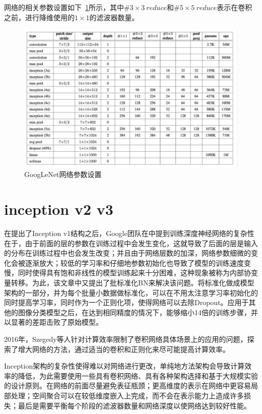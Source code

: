 网络的相关参数设置如下~\ref{fig:GoogLeNet_params}所示，其中$\#3\times3\ reduce$和$\#5\times5\ reduce$表示在卷积之前，进行降维使用的$1\times1$的滤波器数量。

\begin{figure}[htbp]
	\centering
	\includegraphics[width=\linewidth]{readings_figures/GoogLeNet_params.png}
	\caption{GoogLeNet网络参数设置}
	\label{fig:GoogLeNet_params}
\end{figure}

\section{inception v2 v3}

在提出了Inception v1结构之后，Google团队在\cite{ioffe2015batch}中提到训练深度神经网络的复杂性在于，由于前面的层的参数在训练过程中会发生变化，这就导致了后面的层是输入的分布在训练过程中也会发生改变；并且由于网络层数的加深，网络参数细微的变化会被逐渐放大；较低的学习率和仔细地参数初始化也导致了模型的训练速度变慢，同时使得具有饱和非线性的模型训练起来十分困难，这种现象被称为内部协变量转移。为此，该文章中又提出了批标准化BN来解决该问题。将标准化做成模型架构的一部分，并为每个批量小数据做标准化，可以在不用太注意学习率初始化的同时提高学习率，同时作为一个正则化项，使得网络可以去除Dropout。应用于其他的图像分类模型之后，在达到相同精度的情况下，能够缩小14倍的训练步骤，并以显著的差距击败了原始模型。

2016年，Szegedy等人\cite{szegedy2016rethinking}针对计算效率限制了卷积网络具体场景上的应用的问题，探索了增大网络的方法，通过适当的卷积和正则化来尽可能提高计算效率。

Inception架构的复杂性使得难以对网络进行更改，单纯地方法架构会导致计算效率的降低，为此需要使用一些具有卷积网络、具有各种架构选择和基于大规模实验的设计原则。在网络的前面尽量避免表征瓶颈；更高维度的表示在网络中更容易局部处理；空间聚合可以在较低维度嵌入上完成，而不会在表示能力上造成许多损失；最后是需要平衡每个阶段的滤波器数量和网络深度以使网络达到较好性能。

